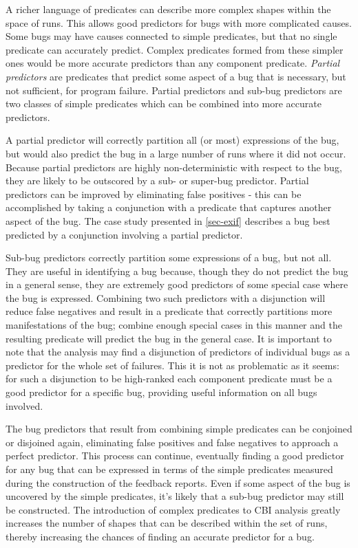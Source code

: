 A richer language of predicates can describe more complex shapes within the space of runs.  This allows good predictors for bugs with more complicated causes.  Some bugs may have causes connected to simple predicates, but that no single predicate can accurately predict.  Complex predicates formed from these simpler ones would be more accurate predictors than any component predicate.  \emph{Partial predictors} are predicates that predict some aspect of a bug that is necessary, but not sufficient, for program failure.  Partial predictors and sub-bug predictors are two classes of simple predicates which can be combined into more accurate predictors.

A partial predictor will correctly partition all (or most) expressions of the bug, but would also predict the bug in a large number of runs where it did not occur.  Because partial predictors are highly non-deterministic with respect to the bug, they are likely to be outscored by a sub- or super-bug predictor.  Partial predictors can be improved by eliminating false positives - this can be accomplished by taking a conjunction with a predicate that captures another aspect of the bug.  The case study presented in \autoref{sec-exif} describes a bug best predicted by a conjunction involving a partial predictor.

Sub-bug predictors correctly partition some expressions of a bug, but not all.  They are useful in identifying a bug because, though they do not predict the bug in a general sense, they are extremely good predictors of some special case where the bug is expressed.  Combining two such predictors with a disjunction will reduce false negatives and result in a predicate that correctly partitions more manifestations of the bug; combine enough special cases in this manner and the resulting predicate will predict the bug in the general case.  It is important to note that the analysis may find a disjunction of predictors of individual bugs as a predictor for the whole set of failures.  This it is not as problematic as it seems: for such a disjunction to be high-ranked each component predicate must be a good predictor for a specific bug, providing useful information on all bugs involved.

The bug predictors that result from combining simple predicates can be conjoined or disjoined again, eliminating false positives and false negatives to approach a perfect predictor.  This process can continue, eventually finding a good predictor for any bug that can be expressed in terms of the simple predicates measured during the construction of the feedback reports.  Even if some aspect of the bug is uncovered by the simple predicates, it's likely that a sub-bug predictor may still be constructed.  The introduction of complex predicates to CBI analysis greatly increases the number of shapes that can be described within the set of runs, thereby increasing the chances of finding an accurate predictor for a bug.

